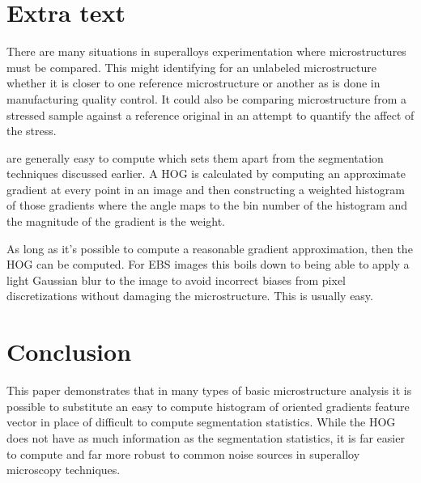 \documentclass[review]{elsarticle}
\begin{document}
	\section{Extra text}
	There are many situations in superalloys experimentation where microstructures must be compared. This might identifying for an unlabeled microstructure whether it is closer to one reference microstructure or another as is done in manufacturing quality control. It could also be comparing microstructure from a stressed sample against a reference original in an attempt to quantify the affect of the stress.
	
	 are generally easy to compute which sets them apart from the segmentation techniques discussed earlier. A HOG is calculated by computing an approximate gradient at every point in an image and then constructing a weighted histogram of those gradients where the angle maps to the bin number of the histogram and the magnitude of the gradient is the weight.

	As long as it's possible to compute a reasonable gradient approximation, then the HOG can be computed. For EBS images this boils down to being able to apply a light Gaussian blur to the image to avoid incorrect biases from pixel discretizations without damaging the microstructure. This is usually easy.

	\section{Conclusion}
	
	This paper demonstrates that in many types of basic microstructure analysis it is possible to substitute an easy to compute histogram of oriented gradients feature vector in place of difficult to compute segmentation statistics. While the HOG does not have as much information as the segmentation statistics, it is far easier to compute and far more robust to common noise sources in superalloy microscopy techniques.
\end{document}
